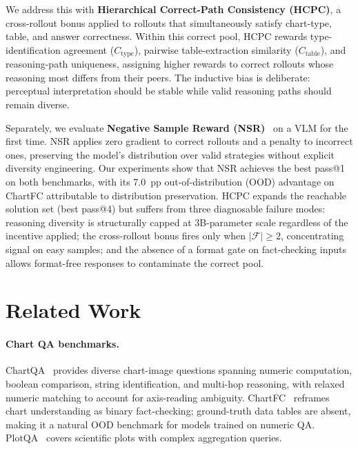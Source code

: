 \documentclass[11pt]{article}
\newcommand{\hcpc}{\textsc{HCPC}}
\newcommand{\nsr}{\textsc{NSR}}
\begin{document}
We address this with \textbf{Hierarchical Correct-Path Consistency (\hcpc)}, a
cross-rollout bonus applied to rollouts that simultaneously satisfy chart-type,
table, and answer correctness.
Within this correct pool, \hcpc{} rewards type-identification agreement
($C_\text{type}$), pairwise table-extraction similarity ($C_\text{table}$), and
reasoning-path uniqueness, assigning higher rewards to correct rollouts whose
reasoning most differs from their peers.
The inductive bias is deliberate: perceptual interpretation should be stable while
valid reasoning paths should remain diverse.

Separately, we evaluate \textbf{Negative Sample Reward (\nsr)}~\citep{zhu2025nsr}
on a VLM for the first time.
\nsr{} applies zero gradient to correct rollouts and a penalty to incorrect ones,
preserving the model's distribution over valid strategies without explicit
diversity engineering.
Our experiments show that \nsr{} achieves the best pass@1 on both benchmarks,
with its 7.0~pp out-of-distribution (OOD) advantage on ChartFC attributable to
distribution preservation.
\hcpc{} expands the reachable solution set (best pass@4) but suffers from three
diagnosable failure modes: reasoning diversity is structurally capped at 3B-parameter
scale regardless of the incentive applied; the cross-rollout bonus fires only when
$|\mathcal{F}| \ge 2$, concentrating signal on easy samples; and the absence of a
format gate on fact-checking inputs allows format-free responses to contaminate the
correct pool.

\section{Related Work}

\paragraph{Chart QA benchmarks.}
ChartQA~\citep{masry2022chartqa} provides diverse chart-image questions spanning
numeric computation, boolean comparison, string identification, and multi-hop
reasoning, with relaxed numeric matching to account for axis-reading ambiguity.
ChartFC~\citep{akhtar2023chartfc} reframes chart understanding as binary
fact-checking; ground-truth data tables are absent, making it a natural OOD
benchmark for models trained on numeric QA.
PlotQA~\citep{plotqa} covers scientific plots with complex aggregation queries.
\end{document}

